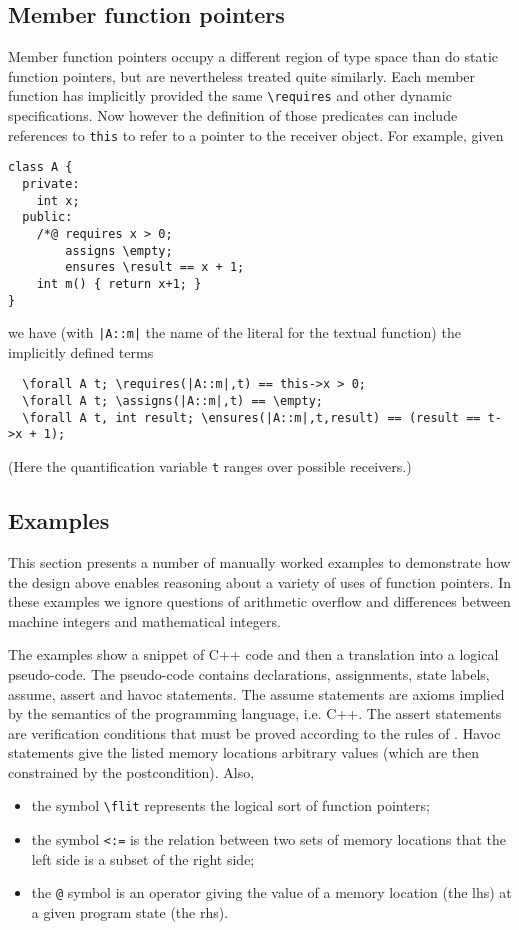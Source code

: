 \subsection{Member function pointers}
\label{sec:memberfp}
Member function pointers occupy a different region of type space than do static function pointers, but are nevertheless treated quite
similarly. Each member function has implicitly provided the same \lstinline|\requires| and other dynamic specifications. Now however the definition of those predicates can include references to \lstinline|this| to refer to a pointer to the receiver object. For example, given
\begin{lstlisting}
class A {
  private:
    int x;
  public:
    /*@ requires x > 0;
        assigns \empty;
        ensures \result == x + 1;
    int m() { return x+1; }
}
\end{lstlisting}
we have (with \lstinline+|A::m|+ the name of the literal for the textual function) the implicitly defined terms
\begin{lstlisting}
  \forall A t; \requires(|A::m|,t) == this->x > 0;
  \forall A t; \assigns(|A::m|,t) == \empty;
  \forall A t, int result; \ensures(|A::m|,t,result) == (result == t->x + 1);
\end{lstlisting}
(Here the quantification variable \lstinline|t| ranges over possible receivers.)

\subsection{Examples}
\label{sec:fpexamples}

This section presents a number of manually worked examples 
to demonstrate how the design above enables reasoning about
a variety of uses of function pointers.
In these examples we ignore questions of arithmetic overflow and 
differences between machine integers and mathematical integers.

The examples show a snippet of C++ code and then a translation into a logical
pseudo-code. The pseudo-code contains declarations, assignments, state labels, assume, assert and havoc statements. 
The assume statements are axioms implied by the semantics of the
programming language, i.e. C++. 
The assert statements are verification conditions that
must be proved according to the rules of \NAME.
Havoc statements give the listed memory locations arbitrary values (which are then constrained by the postcondition). Also,
\begin{itemize}[noitemsep,nolistsep]
	\item the symbol \lstinline|\flit| represents the logical sort of function pointers;
	\item the symbol \lstinline|<:=| is the relation between two sets of memory locations that the left side is a subset of the right side;
	\item the \lstinline|@| symbol is an operator giving the value of a memory location (the lhs) at a given program state (the rhs).
\end{itemize}

